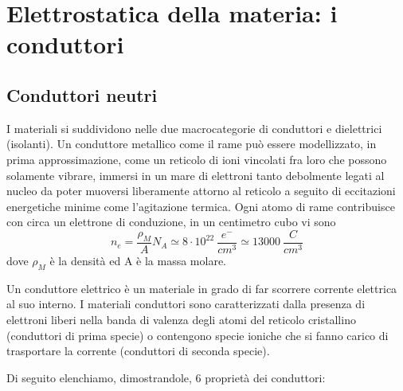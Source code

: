 \documentclass[
10pt, %
a4paper, %
oneside, %
headinclude,footinclude, %
BCOR5mm, %
]{scrartcl}
\begin{document}
\section{Elettrostatica della materia: i conduttori}
\subsection{Conduttori neutri}
I materiali si suddividono nelle due macrocategorie di conduttori e dielettrici (isolanti). Un conduttore metallico come il rame può essere modellizzato, in prima approssimazione, come un reticolo di ioni vincolati fra loro che possono solamente vibrare, immersi in un mare di elettroni tanto debolmente legati al nucleo da poter muoversi liberamente attorno al reticolo a seguito di eccitazioni energetiche minime come l'agitazione termica. Ogni atomo di rame contribuisce con circa un elettrone di conduzione, in un centimetro cubo vi sono
\[n_e = \frac{\rho_M }{A}N_A \simeq 8\cdot 10^22\ \frac{e^-}{cm^3}\simeq13000\ \frac{C}{cm^3}\]
dove $\rho_M$ è la densità ed A è la massa molare.
\begin{definizione}
	Un conduttore elettrico è un materiale in grado di far scorrere corrente elettrica al suo interno. I materiali conduttori sono caratterizzati dalla presenza di elettroni liberi nella banda di valenza degli atomi del reticolo cristallino (conduttori di prima specie) o contengono specie ioniche che si fanno carico di trasportare la corrente (conduttori di seconda specie).
\end{definizione}
Di seguito elenchiamo, dimostrandole, 6 proprietà dei conduttori:
\end{document}

